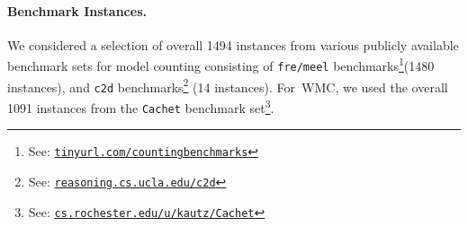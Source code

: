 \documentclass{llncs}
\newcommand{\WMC}{\textsc{WMC}\xspace}%
\newcommand{\instances}[1]{\texttt{#1}}
\begin{document}
\paragraph{Benchmark Instances.}
We considered a selection of overall 1494 instances from various
publicly available benchmark sets for model counting consisting of %
%
%
%
%
\instances{fre/meel} benchmarks\footnote{See:
  \href{http://tinyurl.com/countingbenchmarks}{\nolinkurl{tinyurl.com/countingbenchmarks}}}(1480
instances), %
and \instances{c2d} benchmarks\footnote{See:
  \href{http://reasoning.cs.ucla.edu/c2d/results.html}{\nolinkurl{reasoning.cs.ucla.edu/c2d}}}
(14 instances).
%
For~\WMC, we used the overall 1091 instances from the
\instances{Cachet} benchmark set\footnote{See:
  \href{https://www.cs.rochester.edu/u/kautz/Cachet/Model_Counting_Benchmarks/index.html}{\nolinkurl{cs.rochester.edu/u/kautz/Cachet}}}.
%
\end{document}
